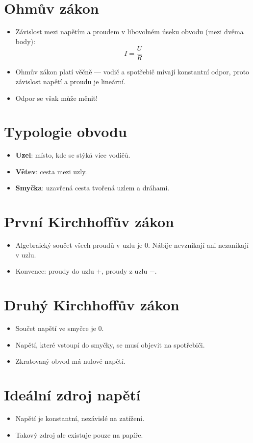 \documentclass{article}
\begin{document}
\section{Ohmův zákon}
\begin{itemize}
    \item Závislost mezi napětím a proudem v libovolném úseku obvodu (mezi dvěma body):
    \[
    I = \frac{U}{R}
    \]
    \item Ohmův zákon platí věčně — vodič a spotřebič mívají konstantní odpor, proto závislost napětí a proudu je lineární.
    \item Odpor se však může měnit!
\end{itemize}

\section{Typologie obvodu}
\begin{itemize}
    \item \textbf{Uzel}: místo, kde se stýká více vodičů.
    \item \textbf{Větev}: cesta mezi uzly.
    \item \textbf{Smyčka}: uzavřená cesta tvořená uzlem a dráhami.
\end{itemize}

\section{První Kirchhoffův zákon}
\begin{itemize}
    \item Algebraický součet všech proudů v uzlu je 0. Nábíje nevznikají ani nezanikají v uzlu.
    \item Konvence: proudy do uzlu \( + \), proudy z uzlu \( - \).
\end{itemize}

\section{Druhý Kirchhoffův zákon}
\begin{itemize}
    \item Součet napětí ve smyčce je 0.
    \item Napětí, které vstoupí do smyčky, se musí objevit na spotřebiči.
    \item Zkratovaný obvod má nulové napětí.
\end{itemize}

\section{Ideální zdroj napětí}
\begin{itemize}
    \item Napětí je konstantní, nezávislé na zatížení.
    \item Takový zdroj ale existuje pouze na papíře.
\end{itemize}
\end{document}
